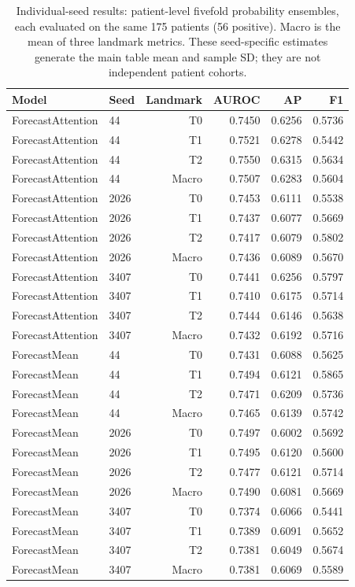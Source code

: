 \begin{table}[t]
\centering
\small
\caption{Individual-seed results: patient-level fivefold probability ensembles, each evaluated on the same 175 patients (56 positive). Macro is the mean of three landmark metrics. These seed-specific estimates generate the main table mean and sample SD; they are not independent patient cohorts.}
\label{tab:seedresults_forecast}
\begin{tabular}{llrrrr}
\toprule
Model & Seed & Landmark & AUROC & AP & F1 \\
\midrule
ForecastAttention & 44 & T0 & 0.7450 & 0.6256 & 0.5736 \\
ForecastAttention & 44 & T1 & 0.7521 & 0.6278 & 0.5442 \\
ForecastAttention & 44 & T2 & 0.7550 & 0.6315 & 0.5634 \\
ForecastAttention & 44 & Macro & 0.7507 & 0.6283 & 0.5604 \\
ForecastAttention & 2026 & T0 & 0.7453 & 0.6111 & 0.5538 \\
ForecastAttention & 2026 & T1 & 0.7437 & 0.6077 & 0.5669 \\
ForecastAttention & 2026 & T2 & 0.7417 & 0.6079 & 0.5802 \\
ForecastAttention & 2026 & Macro & 0.7436 & 0.6089 & 0.5670 \\
ForecastAttention & 3407 & T0 & 0.7441 & 0.6256 & 0.5797 \\
ForecastAttention & 3407 & T1 & 0.7410 & 0.6175 & 0.5714 \\
ForecastAttention & 3407 & T2 & 0.7444 & 0.6146 & 0.5638 \\
ForecastAttention & 3407 & Macro & 0.7432 & 0.6192 & 0.5716 \\
ForecastMean & 44 & T0 & 0.7431 & 0.6088 & 0.5625 \\
ForecastMean & 44 & T1 & 0.7494 & 0.6121 & 0.5865 \\
ForecastMean & 44 & T2 & 0.7471 & 0.6209 & 0.5736 \\
ForecastMean & 44 & Macro & 0.7465 & 0.6139 & 0.5742 \\
ForecastMean & 2026 & T0 & 0.7497 & 0.6002 & 0.5692 \\
ForecastMean & 2026 & T1 & 0.7495 & 0.6120 & 0.5600 \\
ForecastMean & 2026 & T2 & 0.7477 & 0.6121 & 0.5714 \\
ForecastMean & 2026 & Macro & 0.7490 & 0.6081 & 0.5669 \\
ForecastMean & 3407 & T0 & 0.7374 & 0.6066 & 0.5441 \\
ForecastMean & 3407 & T1 & 0.7389 & 0.6091 & 0.5652 \\
ForecastMean & 3407 & T2 & 0.7381 & 0.6049 & 0.5674 \\
ForecastMean & 3407 & Macro & 0.7381 & 0.6069 & 0.5589 \\
\bottomrule
\end{tabular}
\end{table}
